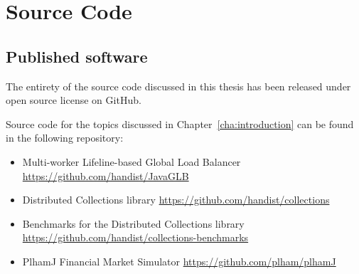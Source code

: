 \chapter{Source Code}

\section{Published software}

The entirety of the source code discussed in this thesis has been released under open source license on GitHub. 

Source code for the topics discussed in Chapter~\ref{cha:introduction} can be found in the following repository:
\begin{itemize}
	\item Multi-worker Lifeline-based Global Load Balancer \url{https://github.com/handist/JavaGLB}
	\item Distributed Collections library \url{https://github.com/handist/collections}
	\item Benchmarks for the Distributed Collections library \url{https://github.com/handist/collections-benchmarks}
	\item PlhamJ Financial Market Simulator \url{https://github.com/plham/plhamJ}
\end{itemize}
